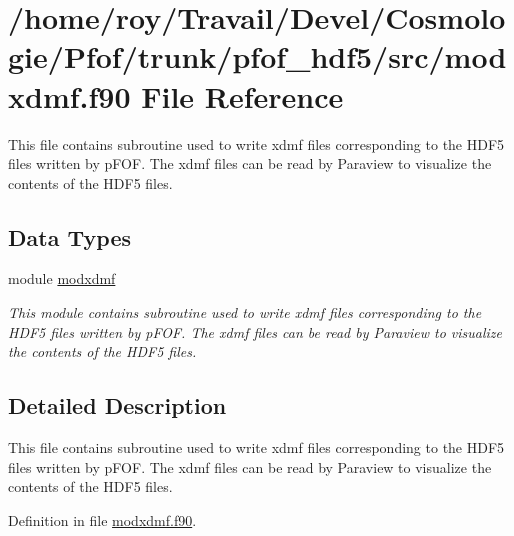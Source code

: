 \hypertarget{pfof__hdf5_2src_2modxdmf_8f90}{\section{/home/roy/\-Travail/\-Devel/\-Cosmologie/\-Pfof/trunk/pfof\-\_\-hdf5/src/modxdmf.f90 File Reference}
\label{pfof__hdf5_2src_2modxdmf_8f90}
}


This file contains subroutine used to write xdmf files corresponding to the H\-D\-F5 files written by p\-F\-O\-F. The xdmf files can be read by Paraview to visualize the contents of the H\-D\-F5 files.  


\subsection*{Data Types}
\begin{DoxyCompactItemize}
\item 
module \hyperlink{classmodxdmf}{modxdmf}
\begin{DoxyCompactList}\small\item\em This module contains subroutine used to write xdmf files corresponding to the H\-D\-F5 files written by p\-F\-O\-F. The xdmf files can be read by Paraview to visualize the contents of the H\-D\-F5 files. \end{DoxyCompactList}\end{DoxyCompactItemize}


\subsection{Detailed Description}
This file contains subroutine used to write xdmf files corresponding to the H\-D\-F5 files written by p\-F\-O\-F. The xdmf files can be read by Paraview to visualize the contents of the H\-D\-F5 files. 

Definition in file \hyperlink{pfof__hdf5_2src_2modxdmf_8f90_source}{modxdmf.\-f90}.

